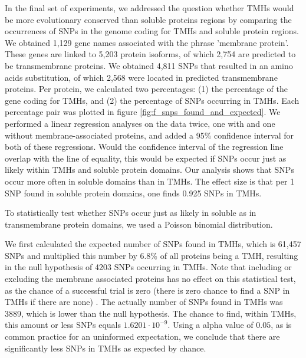 In the final set of experiments, we addressed the question whether TMHs would be more evolutionary conserved than soluble proteins regions by comparing the occurrences of SNPs in the genome coding for TMHs and soluble protein regions. 
We obtained 1,129 gene names associated with the phrase 'membrane protein'.
These genes are linked to 5,203 protein isoforms, 
of which 2,754 are predicted to be transmembrane proteins.
We obtained 4,811 SNPs that resulted in an
amino acids substitution, of which 2,568 were located 
in predicted transmembrane proteins.
Per protein, we calculated two percentages: 
(1) the percentage of the gene coding for TMHs, 
and (2) the percentage of SNPs occurring in TMHs.
Each percentage pair was plotted in figure \ref{fig:f_snps_found_and_expected}.
We performed a linear regression analyses on the data twice,
one with and one without membrane-associated proteins,
and added a 95\% confidence interval for both of these regressions.
Would the confidence interval of the regression line 
overlap with the line of equality,
this would be expected if SNPs occur just as likely within TMHs and soluble protein domains.
Our analysis shows that SNPs occur more often in soluble domains
than in TMHs.
The effect size is that per 1 SNP found in soluble protein
domains, one finds 0.925 SNPs in TMHs.

To statistically test whether SNPs occur just as likely in soluble as
in transmembrane protein domains, we used a Poisson binomial
distribution. 

We first calculated the expected number of SNPs
found in TMHs, which is 61,457 SNPs  and multiplied this number by 6.8\% 
of all proteins being a TMH, resulting in the null hypothesis
of 4203 SNPs occurring in TMHs. 
Note that including or excluding
the membrane associated proteins 
has no effect on this statistical test, as the chance 
of a successful trial is zero (there is zero chance
to find a SNP in TMHs if there are none) .
The actually number of SNPs found in TMHs
was 3889, which is lower than the null hypothesis. 
The chance to find, within TMHs, this amount or less SNPs 
equals $1.6201 \cdot 10^{-9}$.
Using a alpha value of $0.05$, as is common practice for an uninformed
expectation, we conclude that there are significantly less SNPs
in TMHs as expected by chance.

